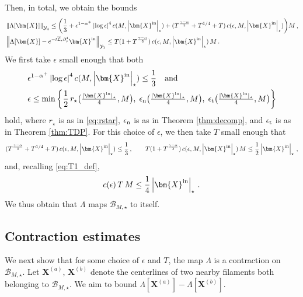 \documentclass[11pt,reqno]{amsart}
\newcommand{\X}{\bm{X}}
\newcommand{\p}{\partial}
\newcommand{\abs}[1]{\left\lvert #1 \right\rvert}
\newcommand{\norm}[1]{\left\lVert #1 \right\rVert}
\newcommand{\mc}[1]{\mathcal{#1}}
\theoremstyle{definition}
\begin{document}
Then, in total, we obtain the bounds 
\begin{equation}
\begin{aligned}
  &\norm{\Lambda[\X]}_{\mc{Y}_4} \le \bigg(\frac{1}{3}+ \epsilon^{1-\alpha^+}\abs{\log\epsilon}^4c(M,\abs{\X^{\rm in}}_\star)
  + (T^{\frac{\gamma-\alpha}{3}}+ T^{1/4}+T)\,c(\epsilon,M,\abs{\X^{\rm in}}_\star) \bigg)M\,,\\
  &\norm{\Lambda[\X]- e^{-t\overline{\mc{L}}_\epsilon\p_s^4}\X^{\rm in}}_{\mc{Y}_1} \le T(1+T^{\frac{\gamma-\alpha}{3}})\,c(\epsilon,M,\abs{\X^{\rm in}}_\star)\,M\,.
\end{aligned}  
\end{equation}
%
We first take $\epsilon$ small enough that both
\begin{equation}\label{eq:epscond1}
\begin{aligned}
  &\epsilon^{1-\alpha^+}\abs{\log\epsilon}^4c(M,\abs{\X^{\rm in}}_\star)\le \frac{1}{3}
  \quad \text{and} \\
  &\epsilon\le \min\bigg\{\frac{1}{2}\,\textstyle r_\star\big(\frac{|\X^{\rm in}|_\star}{4},M\big), \;\epsilon_{\rm n}\big(\frac{|\X^{\rm in}|_\star}{4},M\big),\;\epsilon_{\rm t}\big(\frac{|\X^{\rm in}|_\star}{4},M\big)\bigg\}
\end{aligned} 
\end{equation}
hold, where $r_\star$ is as in \eqref{eq:rstar}, $\epsilon_{\rm n}$ is as in Theorem \ref{thm:decomp}, and $\epsilon_{\rm t}$ is as in Theorem \ref{thm:TDP}. For this choice of $\epsilon$, we then take $T$ small enough that
\begin{equation}\label{eq:Tcond1}
  (T^{\frac{\gamma-\alpha}{3}}+ T^{1/4}+T)\,c(\epsilon,M,\abs{\X^{\rm in}}_\star)\le \frac{1}{3}\,, \qquad 
  T(1+T^{\frac{\gamma-\alpha}{3}})\,c(\epsilon,M,\abs{\X^{\rm in}}_\star)\,M \le \frac{1}{2}\abs{\X^{\rm in}}_\star\,,
\end{equation}
and, recalling \eqref{eq:T1_def},
\begin{equation}\label{eq:Tcond2}
  c(\epsilon)\,T\,M \le \frac{1}{4}\abs{\X^{\rm in}}_\star\,.
\end{equation}
We thus obtain that $\Lambda$ maps $\mc{B}_{M,\star}$ to itself.





\subsection{Contraction estimates}
We next show that for some choice of $\epsilon$ and $T$, the map $\Lambda$ is a contraction on $\mc{B}_{M,\star}$. Let $\X^{(a)}$, $\X^{(b)}$ denote the centerlines of two nearby filaments both belonging to $\mc{B}_{M,\star}$. We aim to bound $\Lambda[\X^{(a)}]-\Lambda[\X^{(b)}]$. 
\end{document}
